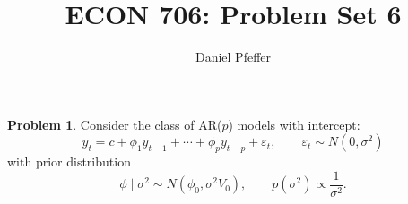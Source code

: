 \documentclass[oneside,reqno]{amsart}
\title{ECON 706: Problem Set 6}
\author{Daniel Pfeffer}
\newcommand{\eps}{\varepsilon}
\theoremstyle{definition}
\newtheorem{prob}{Problem}
\begin{document}
\maketitle

\begin{prob}
Consider the class of AR($p$) models with intercept: 
\begin{equation}\label{eq:arp}
	y_t =  c +\phi_1 y_{t-1} + \cdots + \phi_p y_{t-p} + \eps_t, 
	\qquad 
	\eps_t \sim N(0, \sigma^2)
\end{equation}
with prior distribution 
\begin{equation}\label{eq:arp-prior}
	\phi \mid \sigma^2 \sim N(\phi_0, \sigma^2 V_0),
	\qquad 
	p(\sigma^2) \propto \frac{1}{\sigma^2}. 
\end{equation}
\end{prob}
\end{document}
